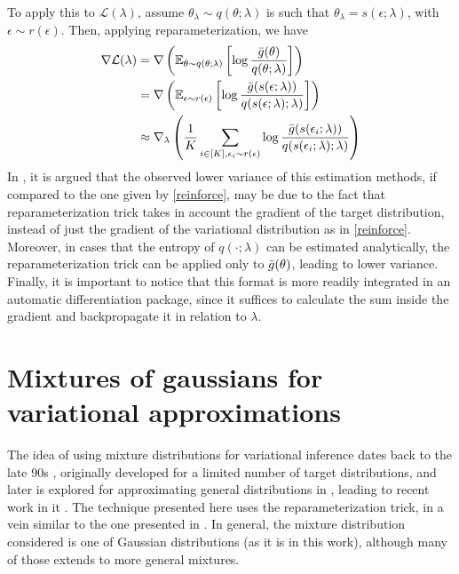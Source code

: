 To apply this to $\mathcal{L}(\lambda)$, assume $\theta_\lambda \sim q(\theta;\lambda)$ is such that $\theta_\lambda = s(\epsilon;\lambda)$, with $\epsilon \sim r(\epsilon)$. Then, applying reparameterization, we have
\begin{equation}\label{mcreparameterization}
\begin{split}
 \nabla \mathcal{L}(\lambda) & = \nabla \left({\mathbb E}_{\theta \sim  q(\theta;\lambda)}\left[\log \frac{{\bar{g}}(\theta)}{q(\theta;\lambda)}\right] \right) \\
 & =\nabla \left( {\mathbb E}_{\epsilon \sim r(\epsilon)} \left[\log \frac{ {\bar{g}}(s(\epsilon;\lambda))}{q(s(\epsilon;\lambda);\lambda)}\right]\right) \\
 & \approx \nabla_\lambda \left( \frac{1}{K} \sum_{i \in [K], \epsilon_i \sim r(\epsilon)} \log \frac{ {\bar{g}}(s(\epsilon_i;\lambda))}{q(s(\epsilon_i;\lambda);\lambda)} \right)
\end{split}
\end{equation}
In \cite{Zhang_2019}, it is argued that the observed lower variance of this estimation methods, if compared to the one given by \eqref{reinforce}, may be due to the fact that reparameterization trick takes in account the gradient of the target distribution, instead of just the gradient of the variational distribution as in \eqref{reinforce}. Moreover, in cases that the entropy of $q(\cdot;\lambda)$ can be estimated analytically, the reparameterization trick can be applied only to ${\bar{g}}(\theta)$, leading to lower variance. Finally, it is important to notice that this format is more readily integrated in an automatic differentiation package, since it suffices to calculate the sum inside the gradient and backpropagate it in relation to $\lambda$.

\section{Mixtures of gaussians for variational approximations}\label{mixgaussiansvi}

The idea of using mixture distributions for variational inference dates back to the late 90s \cite{Bishop_1997,Jaakkola_1998}, originally developed for a limited number of target distributions, and later is explored for approximating general distributions in \cite{Gershman_2012,Salimans_2012}, leading to recent work in it \cite{Acerbi_2018,Arenz_2018,Guo_2016,Jankowiak_2019,Miller_2016}. The technique presented here uses the reparameterization trick, in a vein similar to the one presented in \cite{Miller_2016}. In general, the mixture distribution considered is one of Gaussian distributions (as it is in this work), although many of those extends to more general mixtures.

